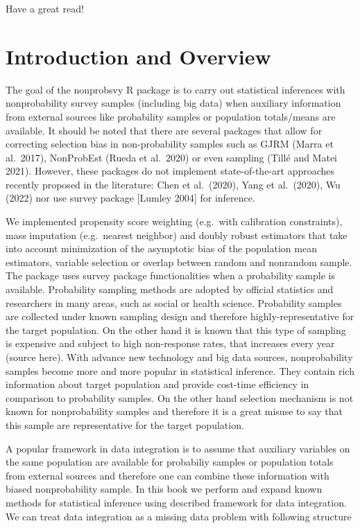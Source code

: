 \documentclass[
  letterpaper,
  DIV=11,
  numbers=noendperiod]{scrreprt}
\begin{document}
Have a great read!


\chapter{Introduction and Overview}\label{introduction-and-overview}

The goal of the nonprobsvy R package is to carry out statistical
inferences with nonprobability survey samples (including big data) when
auxiliary information from external sources like probability samples or
population totals/means are available. It should be noted that there are
several packages that allow for correcting selection bias in
non-probability samples such as GJRM (Marra et al.~2017), NonProbEst
(Rueda et al.~2020) or even sampling (Tillé and Matei 2021). However,
these packages do not implement state-of-the-art approaches recently
proposed in the literature: Chen et al.~(2020), Yang et al.~(2020), Wu
(2022) nor use survey package {[}Lumley 2004{]} for inference.

We implemented propensity score weighting (e.g.~with calibration
constraints), mass imputation (e.g.~nearest neighbor) and doubly robust
estimators that take into account minimization of the asymptotic bias of
the population mean estimators, variable selection or overlap between
random and nonrandom sample. The package uses survey package
functionalities when a probability sample is available. Probability
sampling methods are adopted by official statistics and researchers in
many areas, such as social or health science. Probability samples are
collected under known sampling design and therefore
highly-representative for the target population. On the other hand it is
known that this type of sampling is expensive and subject to high
non-response rates, that increases every year (source here). With
advance new technology and big data sources, nonprobability samples
become more and more popular in statistical inference. They contain rich
information about target population and provide cost-time efficiency in
comparison to probability samples. On the other hand selection mechanism
is not known for nonprobability samples and therefore it is a great
misuse to say that this sample are representative for the target
population.

A popular framework in data integration is to assume that auxiliary
variables on the same population are available for probabiliy samples or
population totals from external sources and therefore one can combine
these information with biased nonprobability sample. In this book we
perform and expand known methods for statistical inference using
described framework for data integration. We can treat data integration
as a missing data problem with following structure
\end{document}

